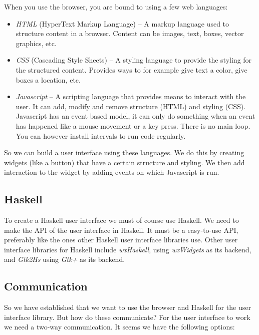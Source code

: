 \documentclass[11pt]{article}
\begin{document}
When you use the browser, you are bound to using a few web languages:

\begin{itemize}
\item \textit{HTML} (HyperText Markup Language) -- A markup language used to structure content in a browser.
Content can be images, text, boxes, vector graphics, etc.
\item \textit{CSS} (Cascading Style Sheets) -- A styling language to provide the styling for the structured content.
Provides ways to for example give text a color, give boxes a location, etc.
\item \textit{Javascript} -- A scripting language that provides means to interact with the user.
It can add, modify and remove structure (HTML) and styling (CSS). Javascript has an event based model, it can only do something when an event has happened like a mouse movement or a key press.
There is no main loop.
You can however install intervals to run code regularly.
\end{itemize}

So we can build a user interface using these languages.
We do this by creating widgets (like a button) that have a certain structure and styling.
We then add interaction to the widget by adding events on which Javascript is run.

\subsection{Haskell}

To create a Haskell user interface we must of course use Haskell.
We need to make the API of the user interface in Haskell.
It must be a easy-to-use API, preferably like the ones other Haskell user interface libraries use.
Other user interface libraries for Haskell include \textit{wxHaskell}, using \textit{wxWidgets} as its backend, and \textit{Gtk2Hs} using \textit{Gtk+} as its backend.

\subsection{Communication}

So we have established that we want to use the browser and Haskell for the user interface library.
But how do these communicate?
For the user interface to work we need a two-way communication.
It seems we have the following options:
\end{document}
